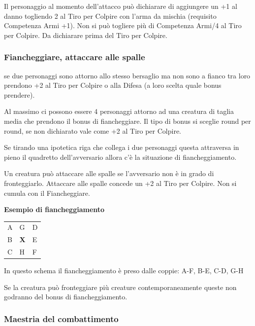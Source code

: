 \begin{multicols}{2}
Il personaggio al momento dell'attacco può dichiarare di aggiungere un +1 al danno togliendo 2 al Tiro per Colpire con l'arma da mischia (requisito Competenza Armi +1). Non si può togliere più di Competenza Armi/4 al Tiro per Colpire. Da dichiarare prima del Tiro per Colpire.

\subsubsection{Fiancheggiare, attaccare alle spalle}\hypertarget{fiancheggiare}{} \label{fiancheggiare}

se due personaggi sono attorno allo stesso bersaglio ma non sono a fianco tra loro prendono +2 al Tiro per Colpire o alla Difesa (a loro scelta quale bonus prendere).

Al massimo ci possono essere 4 personaggi attorno ad una creatura di taglia media che prendono il bonus di fiancheggiare. Il tipo di bonus si sceglie round per round, se non dichiarato vale come +2 al Tiro per Colpire.

Se tirando una ipotetica riga che collega i due personaggi questa attraversa in pieno il quadretto dell'avversario allora c'è la situazione di fiancheggiamento.

Un creatura può attaccare alle spalle se l'avversario non è in grado di fronteggiarlo. Attaccare alle spalle concede un +2 al Tiro per Colpire. Non si cumula con il Fiancheggiare.

\medskip

\textbf{Esempio di fiancheggiamento}

\medskip

\begin{tabular}{lll}
\toprule
A & G & D\\
B & \textbf{X} & E\\
C & H & F
\end{tabular}

\bigskip

In questo schema il fiancheggiamento è preso dalle coppie: A-F, B-E, C-D, G-H

\bigskip

Se la creatura può fronteggiare più creature contemporaneamente queste non godranno del bonus di fiancheggiamento.

\subsubsection{Maestria del combattimento} \label{maestriacombattimento}


\end{multicols}
